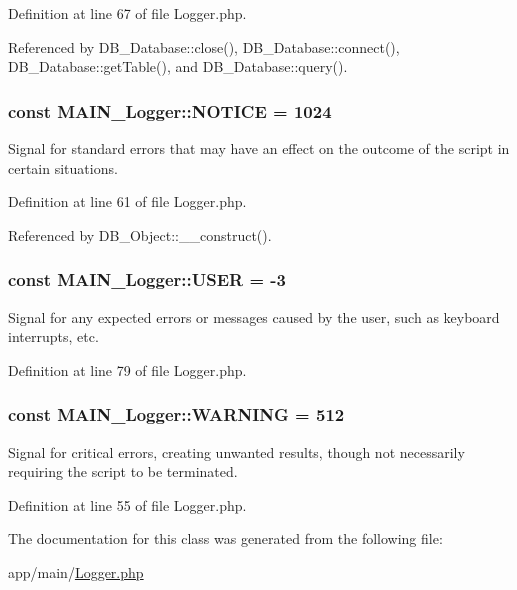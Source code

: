 Definition at line 67 of file Logger.php.

Referenced by DB\_\-Database::close(), DB\_\-Database::connect(), DB\_\-Database::getTable(), and DB\_\-Database::query().\hypertarget{classMAIN__Logger_a104a24882667b4b8f4452abb03c8266c}{
\subsubsection[{NOTICE}]{\setlength{\rightskip}{0pt plus 5cm}const {\bf MAIN\_\-Logger::NOTICE} = 1024}}
\label{d3/dff/classMAIN__Logger_a104a24882667b4b8f4452abb03c8266c}
Signal for standard errors that may have an effect on the outcome of the script in certain situations. 

Definition at line 61 of file Logger.php.

Referenced by DB\_\-Object::\_\-\_\-construct().\hypertarget{classMAIN__Logger_a75824ecd65029652b81460f69b83b779}{
\subsubsection[{USER}]{\setlength{\rightskip}{0pt plus 5cm}const {\bf MAIN\_\-Logger::USER} = -\/3}}
\label{d3/dff/classMAIN__Logger_a75824ecd65029652b81460f69b83b779}
Signal for any expected errors or messages caused by the user, such as keyboard interrupts, etc. 

Definition at line 79 of file Logger.php.\hypertarget{classMAIN__Logger_a9d79bb27ec1dfe5b64f8a78f2f6ceb9b}{
\subsubsection[{WARNING}]{\setlength{\rightskip}{0pt plus 5cm}const {\bf MAIN\_\-Logger::WARNING} = 512}}
\label{d3/dff/classMAIN__Logger_a9d79bb27ec1dfe5b64f8a78f2f6ceb9b}
Signal for critical errors, creating unwanted results, though not necessarily requiring the script to be terminated. 

Definition at line 55 of file Logger.php.

The documentation for this class was generated from the following file:\begin{DoxyCompactItemize}
\item 
app/main/\hyperlink{Logger_8php}{Logger.php}\end{DoxyCompactItemize}
